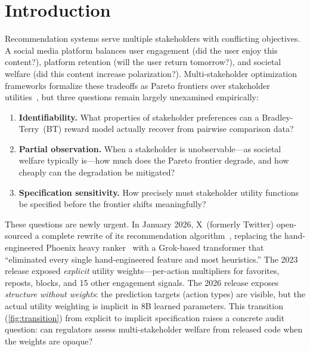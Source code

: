 \documentclass[11pt,letterpaper]{article}
\begin{document}
\section{Introduction}
\label{sec:intro}

Recommendation systems serve multiple stakeholders with conflicting
objectives. A social media platform balances user engagement (did the
user enjoy this content?), platform retention (will the user return
tomorrow?), and societal welfare (did this content increase
polarization?). Multi-stakeholder optimization frameworks formalize
these tradeoffs as Pareto frontiers over stakeholder
utilities~\cite{burke2017multistakeholder, multifr2022,
eval2025multistakeholder}, but three questions remain largely
unexamined empirically:

\begin{enumerate}
  \item \textbf{Identifiability.} What properties of stakeholder
    preferences can a Bradley-Terry~(BT) reward model actually recover
    from pairwise comparison data?
  \item \textbf{Partial observation.} When a stakeholder is
    unobservable---as societal welfare typically is---how much does the
    Pareto frontier degrade, and how cheaply can the degradation be
    mitigated?
  \item \textbf{Specification sensitivity.} How precisely must
    stakeholder utility functions be specified before the frontier
    shifts meaningfully?
\end{enumerate}

These questions are newly urgent. In January 2026, X~(formerly
Twitter) open-sourced a complete rewrite of its recommendation
algorithm~\cite{xalgorithm2026}, replacing the hand-engineered
Phoenix heavy ranker~\cite{xalgorithm2023} with a Grok-based
transformer that ``eliminated every single hand-engineered feature and
most heuristics.'' The 2023 release exposed \emph{explicit} utility
weights---per-action multipliers for favorites, reposts, blocks, and
15 other engagement signals. The 2026 release exposes
\emph{structure without weights}: the prediction targets (action
types) are visible, but the actual utility weighting is implicit in
8B learned parameters. This transition (\cref{fig:transition}) from explicit to implicit
specification raises a concrete audit question: can regulators assess
multi-stakeholder welfare from released code when the weights are
opaque?~\cite{shaped2023secrets}
\end{document}
